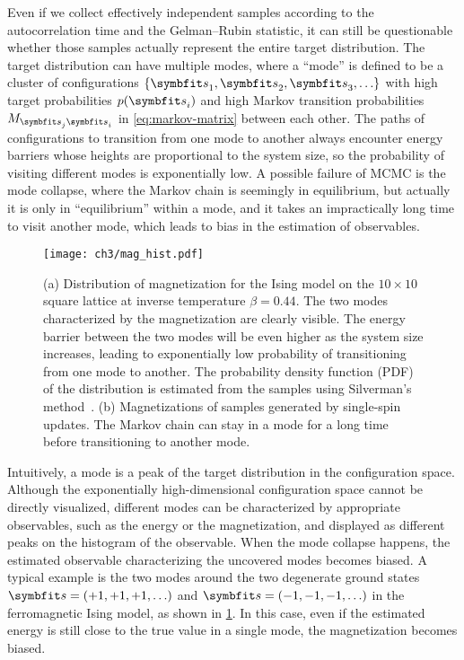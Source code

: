Even if we collect effectively independent samples according to the autocorrelation time and the Gelman--Rubin statistic, it can still be questionable whether those samples actually represent the entire target distribution. The target distribution can have multiple modes, where a ``mode'' is defined to be a cluster of configurations $\{\vs_1, \vs_2, \vs_3, \ldots\}$ with high target probabilities $p(\vs_i)$ and high Markov transition probabilities $M_{\vs_j \vs_i}$ in \cref{eq:markov-matrix} between each other. The paths of configurations to transition from one mode to another always encounter energy barriers whose heights are proportional to the system size, so the probability of visiting different modes is exponentially low. A possible failure of MCMC is the mode collapse, where the Markov chain is seemingly in equilibrium, but actually it is only in ``equilibrium'' within a mode, and it takes an impractically long time to visit another mode, which leads to bias in the estimation of observables.

\begin{figure}[htb]
\centering
\texttt{[image: ch3/mag\_hist.pdf]}
\caption[Distribution of magnetization for Ising model]{
(a) Distribution of magnetization for the Ising model on the $10 \times 10$ square lattice at inverse temperature $\beta = 0.44$.
The two modes characterized by the magnetization are clearly visible.
The energy barrier between the two modes will be even higher as the system size increases, leading to exponentially low probability of transitioning from one mode to another.
The probability density function (PDF) of the distribution is estimated from the samples using Silverman’s method~\cite{silverman1986density}.
(b) Magnetizations of samples generated by single-spin updates. The Markov chain can stay in a mode for a long time before transitioning to another mode.
}
\label{fig:mag-hist}
\end{figure}

Intuitively, a mode is a peak of the target distribution in the configuration space. Although the exponentially high-dimensional configuration space cannot be directly visualized, different modes can be characterized by appropriate observables, such as the energy or the magnetization, and displayed as different peaks on the histogram of the observable. When the mode collapse happens, the estimated observable characterizing the uncovered modes becomes biased. A typical example is the two modes around the two degenerate ground states $\vs = (+1, +1, +1, \ldots)$ and $\vs = (-1, -1, -1, \ldots)$ in the ferromagnetic Ising model, as shown in \cref{fig:mag-hist}. In this case, even if the estimated energy is still close to the true value in a single mode, the magnetization becomes biased.

